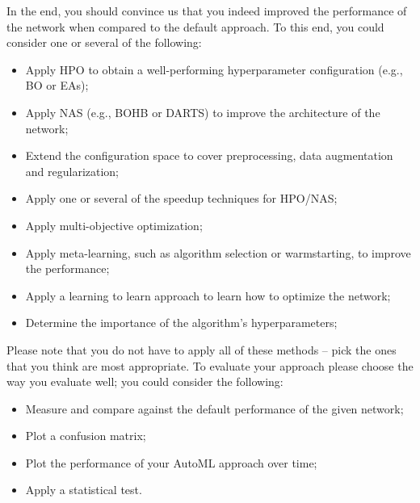 \documentclass[10pt,a4paper]{article}
\begin{document}
		
		In the end, you should convince us that you indeed improved the performance of the network when compared to the default approach.
		To this end, you could consider one or several of the following:
		\begin{itemize}
			\item Apply HPO to obtain a well-performing hyperparameter configuration (e.g., BO or EAs);
			\item Apply NAS (e.g., BOHB or DARTS) to improve the architecture of the network;
			\item Extend the configuration space to cover preprocessing, data augmentation and regularization;
			\item Apply one or several of the speedup techniques for HPO/NAS;
			\item Apply multi-objective optimization;
			\item Apply meta-learning, such as algorithm selection or warmstarting, to improve the performance;
			\item Apply a learning to learn approach to learn how to optimize the network;
     		\item Determine the importance of the algorithm's hyperparameters;
		\end{itemize}
		\noindent
		Please note that you do not have to apply all of these methods -- pick the ones that you think are most appropriate.
		To evaluate your approach please choose the way you evaluate well; you could consider the following:
		\begin{itemize}
			\item Measure and compare against the default performance of the given network;
			\item Plot a confusion matrix;
			\item Plot the performance of your AutoML approach over time;
			\item Apply a statistical test.
		\end{itemize}
\end{document}

